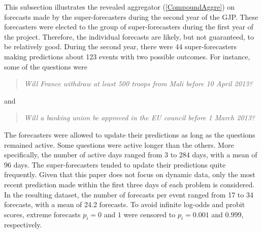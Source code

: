 \documentclass[11pt]{article}
\theoremstyle{definition}
\theoremstyle{definition}
\begin{document}
This subsection illustrates the revealed aggregator (\ref{CompoundAggre})
on forecasts made by the super-forecasters during the second year of the GJP. These forecasters were
elected to the group of super-forecasters during the first year of the project. 
Therefore, the individual forecasts are
likely, but not guaranteed, to be relatively good. During the second year, there were 44 super-forecasters making predictions about 123 events with two possible outcomes. For instance, some of
the questions were
\begin{quote}\textit{
Will France withdraw at least 500 troops from Mali before 10 April 2013?
}\end{quote}
and
\begin{quote}\textit{
Will a banking union be approved in the EU council before 1 March 2013? 
}
\end{quote}
 The forecasters were allowed to update their predictions as long as the
questions remained active. Some questions were active longer than the
others. More specifically, the number of active days ranged from 3 to 284 days,
with a mean of 96 days. The super-forecasters tended to update their predictions quite frequently. Given that this paper does not focus on dynamic
data, only the most recent prediction made within the first three days of each problem is considered.  
In the resulting
dataset, the number of forecasts per event ranged from 17 to 34
forecasts, with a mean of 24.2 forecasts. To avoid infinite log-odds
and probit scores, extreme forecasts $p_i = 0$ and $1$ were
censored to $p_i = 0.001$ and $0.999$, respectively.
 
\end{document}
